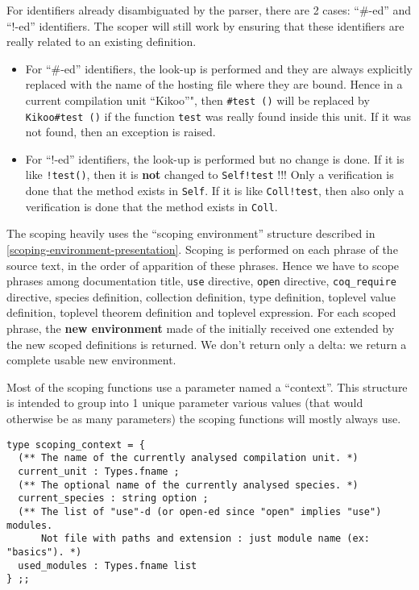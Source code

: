 For identifiers already disambiguated by the parser, there are 2 cases:
``\#-ed'' and ``!-ed'' identifiers. The scoper will still work by
ensuring that these identifiers are really related to an existing
definition.
\begin{itemize}
\item For ``\#-ed'' identifiers, the look-up is performed and they are
  always explicitly replaced with the name of the hosting file where
  they are bound. Hence in a current compilation unit ``Kikoo''", then
  {\tt \#test ()} will be replaced by {\tt Kikoo\#test ()} if the
  function {\tt test} was really found inside this unit. If it was not
  found, then an exception is raised.

\item For ``!-ed'' identifiers, the look-up is performed but no change
  is done. If it is like {\tt !test()}, then it is {\bf not} changed to
  {\tt Self!test} !!! Only a verification is done that the method
  exists in {\tt Self}. If it is like {\tt Coll!test}, then also only
  a verification is done that the method exists in {\tt Coll}.
\end{itemize}

The scoping heavily uses the ``scoping environment'' structure
described in \ref{scoping-environment-presentation}. Scoping is
performed on each phrase of the source text, in the order of
apparition of these phrases. Hence we have to scope phrases among
documentation title, {\tt use} directive, {\tt open} directive,
{\tt coq\_require} directive, species definition, collection
definition, type definition, toplevel value definition, toplevel
theorem definition and toplevel expression. For each scoped phrase,
the {\bf new environment} made of the initially received one extended
by the new scoped definitions is returned. We don't return only a
delta: we return a complete usable new environment.

Most of the scoping functions use a parameter named a
``context''. This structure is intended to group into 1 unique
parameter various values (that would otherwise be as many parameters)
the scoping functions will mostly always use.
{\footnotesize
\begin{lstlisting}[language=MyOCaml]
type scoping_context = {
  (** The name of the currently analysed compilation unit. *)
  current_unit : Types.fname ;
  (** The optional name of the currently analysed species. *)
  current_species : string option ;
  (** The list of "use"-d (or open-ed since "open" implies "use") modules.
      Not file with paths and extension : just module name (ex: "basics"). *)
  used_modules : Types.fname list
} ;;
\end{lstlisting}
}


